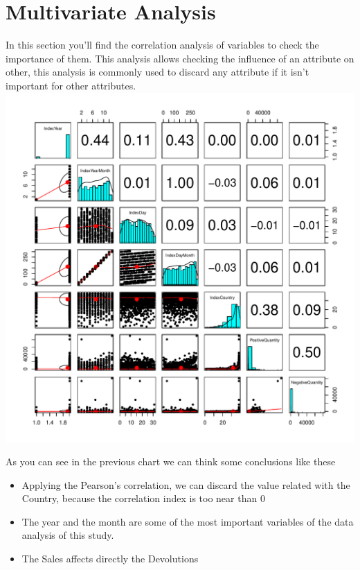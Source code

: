 \documentclass[conference]{IEEEtran}\usepackage[]{graphicx}\usepackage[]{color}
\makeatletter
\def\maxwidth{ %
  \ifdim\Gin@nat@width>\linewidth
    \linewidth
  \else
    \Gin@nat@width
  \fi
}
\newenvironment{knitrout}{}{} %
\makeatother
\begin{document}
\section{Multivariate Analysis}
In this section you'll find the correlation analysis of variables to check the importance of them. This analysis allows checking the influence of an attribute on other, this analysis is commonly used to discard any attribute if it isn't important for other attributes.\\
\begin{knitrout}
\color{fgcolor}
\includegraphics[width=\maxwidth]{figure/pairs-1} 

\end{knitrout}

As you can see in the previous chart we can think some conclusions like these
\begin{itemize}
 \item Applying the Pearson's correlation, we can discard the value related with the Country, because the correlation index is too near than 0
 \item The year and the month are some of the most important variables of the data analysis of this study.
 \item The Sales affects directly the Devolutions
\end{itemize}
\end{document}
